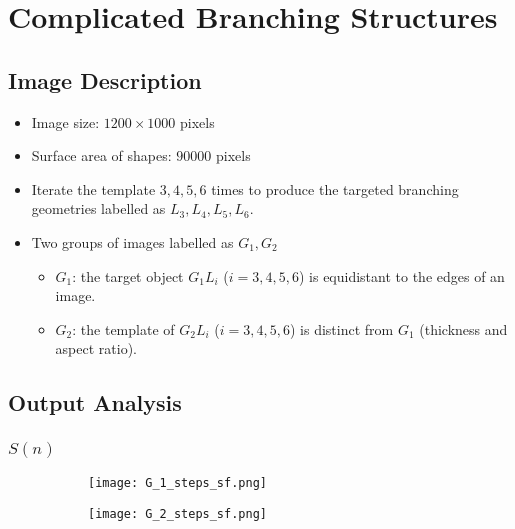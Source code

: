 \section{Complicated Branching Structures}


   \subsection{Image Description}

     \begin{itemize}
         \item Image size: $1200 \times 1000$ pixels
         \item Surface area of shapes: $90000$ pixels
         \item Iterate the template $3, 4, 5, 6$ times to produce the targeted branching geometries labelled as $L_3, L_4, L_5, L_6$.
         \item Two groups of images labelled as $G_1, G_2$

           \begin{itemize}
             \item $G_1$: the target object $G_1 L_i$ ($i=3, 4, 5, 6$) is equidistant to the edges of an image.
             \item $G_2$: the template of $G_2 L_i$ ($i=3, 4, 5, 6$) is distinct from $G_1$ (thickness and aspect ratio). 
           \end{itemize}
           
     \end{itemize}



   \subsection{Output Analysis}


     \subsubsection{$S(n)$}




     
       \begin{figure}
        \centering
        
        \begin{subfigure}[b]{0.45\textwidth}
          \texttt{[image: G\_1\_steps\_sf.png]}
          \caption{}
          \label{fig:sf_g1_branch_steps}
        \end{subfigure}
        \hfill
        \begin{subfigure}[b]{0.45\textwidth}
          \texttt{[image: G\_2\_steps\_sf.png]}
          \caption{}
          \label{fig:sf_g2_branch_steps}
        \end{subfigure}

        \caption{}
        \label{fig:sf_branch_steps}

      \end{figure}




